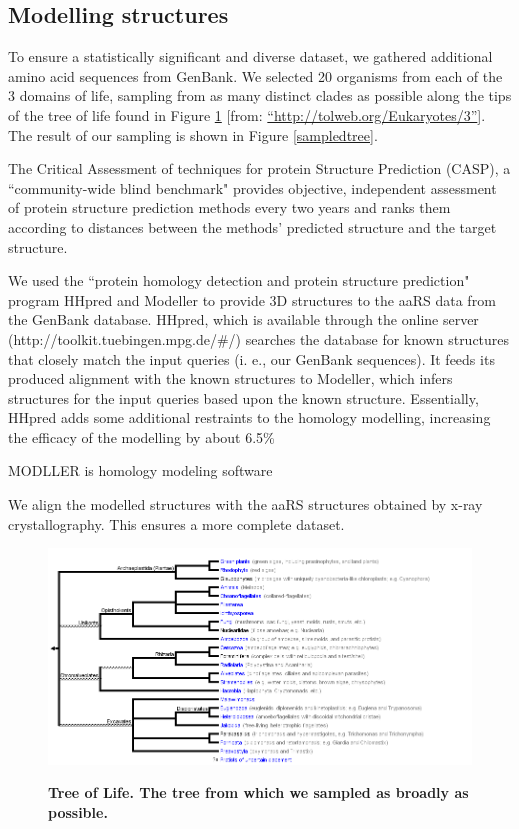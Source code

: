 \documentclass[10pt,letterpaper]{article}
\begin{document}
\subsection*{Modelling structures}
To ensure a statistically significant and diverse dataset, we gathered additional amino acid sequences from GenBank.  
We selected 20 organisms from each of the 3 domains of life, sampling from as many distinct clades as possible along the tips of the tree of life found in Figure \ref{treeoflife} [from: \hyperref[label_name]{``http://tolweb.org/Eukaryotes/3''}]. 
The result of our sampling is shown in Figure \ref{sampledtree}.

The Critical Assessment of techniques for protein Structure Prediction (CASP), a ``community-wide blind benchmark" provides objective, independent assessment of protein structure prediction methods every two years and ranks them according to distances between the methods' predicted structure and the target structure. \cite{CASP} \cite{CASP1}



We used the ``protein homology detection and protein structure prediction" program HHpred \cite{HHpred} and Modeller \cite{Modeller} to provide 3D structures to the aaRS data from the GenBank database.  
HHpred, which is available through the online server (http://toolkit.tuebingen.mpg.de/\#/) searches the database for known structures that closely match the input queries (i. e., our GenBank sequences).  
It feeds its produced alignment with the known structures to Modeller, which infers structures for the input queries based upon the known structure.
Essentially, HHpred adds some additional restraints to the homology modelling, increasing the efficacy of the modelling by about 6.5\% \cite{HHpred1}

MODLLER is homology modeling software 

We align the modelled structures with the aaRS structures obtained by x-ray crystallography.  This ensures a more complete dataset.


\begin{figure}
  \caption{\bf Tree of Life.  The tree from which we sampled as broadly as possible.}
  \centering
    \includegraphics[width=\textwidth]{Eukaryotes.png}
  \label{treeoflife}  
\end{figure}
\end{document}
